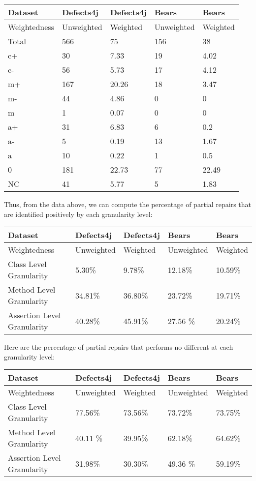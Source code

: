 \documentclass[sigconf, timestamp-false, anonymous=true]{acmart}
\begin{document}
\begin{tabular}{| l | l | l | l | l |} \hline
    Dataset & Defects4j & Defects4j & Bears & Bears  \\ \hline
    Weightedness & Unweighted & Weighted & Unweighted & Weighted \\ \hline
    Total & 566 & 75 & 156 & 38 \\ \hline
    c+ & 30 & 7.33 & 19 & 4.02 \\
    c- & 56 & 5.73 & 17 & 4.12 \\
    m+ & 167 & 20.26 & 18 & 3.47 \\
    m- & 44 & 4.86 & 0 & 0 \\
    m~ & 1 & 0.07 & 0 & 0 \\
    a+ & 31 & 6.83 & 6 & 0.2 \\
    a- & 5 & 0.19 & 13 & 1.67 \\
    a~ & 10 & 0.22 & 1 & 0.5 \\
    0 & 181 & 22.73 & 77 & 22.49 \\
    NC & 41 & 5.77 & 5 & 1.83 \\
    \hline
    
    
    \end{tabular}
    
    Thus, from the data above, we can compute the percentage of partial repairs that are identified positively by each granularity level:
    
    \begin{tabular}{| l | l | l | l | l |} \hline
    Dataset & Defects4j & Defects4j & Bears & Bears  \\ \hline
    Weightedness & Unweighted & Weighted & Unweighted & Weighted \\ \hline
    Class Level Granularity & 5.30\% & 9.78\% & 12.18\% & 10.59\%\\
    Method Level Granularity & 34.81\% & 36.80\% & 23.72\% & 19.71\% \\
    Assertion Level Granularity & 40.28\% & 45.91\% & 27.56 \% & 20.24\% \\
    \hline
    
    \end{tabular}

    Here are the percentage of partial repairs that performs no different at each granularity level:
    
    \begin{tabular}{| l | l | l | l | l |} \hline
    Dataset & Defects4j & Defects4j & Bears & Bears  \\ \hline
    Weightedness & Unweighted & Weighted & Unweighted & Weighted \\ \hline
    Class Level Granularity & 77.56\% & 73.56\% & 73.72\% & 73.75\%\\
    Method Level Granularity & 40.11 \% & 39.95\% & 62.18\% & 64.62\% \\
    Assertion Level Granularity & 31.98\% & 30.30\% & 49.36 \% & 59.19\% \\
    \hline
    
    \end{tabular}
    
\end{document}
